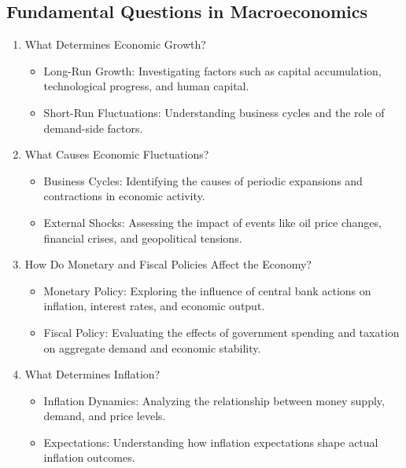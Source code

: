 \documentclass[10pt]{article}
\begin{document}
\subsection*{Fundamental Questions in Macroeconomics}
\begin{enumerate}
  \item What Determines Economic Growth?

    \begin{itemize}
      \item Long-Run Growth: Investigating factors such as capital accumulation, technological progress, and human capital.
      \item Short-Run Fluctuations: Understanding business cycles and the role of demand-side factors.
    \end{itemize}

  \item What Causes Economic Fluctuations?

    \begin{itemize}
      \item Business Cycles: Identifying the causes of periodic expansions and contractions in economic activity.
      \item External Shocks: Assessing the impact of events like oil price changes, financial crises, and geopolitical tensions.
    \end{itemize}

  \item How Do Monetary and Fiscal Policies Affect the Economy?

    \begin{itemize}
      \item Monetary Policy: Exploring the influence of central bank actions on inflation, interest rates, and economic output.
      \item Fiscal Policy: Evaluating the effects of government spending and taxation on aggregate demand and economic stability.
    \end{itemize}

  \item What Determines Inflation?

    \begin{itemize}
      \item Inflation Dynamics: Analyzing the relationship between money supply, demand, and price levels.
      \item Expectations: Understanding how inflation expectations shape actual inflation outcomes.
    \end{itemize}


\end{enumerate}
\end{document}
